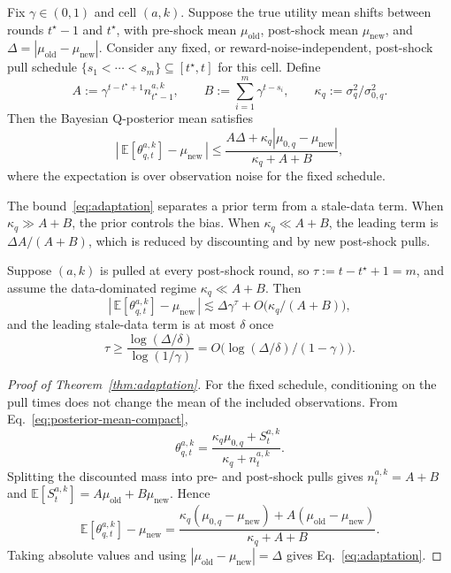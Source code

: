 \begin{theorem}
\label{thm:adaptation}
Fix $\gamma\in(0,1)$ and cell $(a,k)$. Suppose the true utility mean shifts
between rounds $t^\star-1$ and $t^\star$, with pre-shock mean
$\mu_{\mathrm{old}}$, post-shock mean $\mu_{\mathrm{new}}$, and
$\Delta=|\mu_{\mathrm{old}}-\mu_{\mathrm{new}}|$. Consider any fixed, or
reward-noise-independent, post-shock pull schedule
$\{s_1<\cdots<s_m\}\subseteq[t^\star,t]$ for this cell. Define
\[
A:=\gamma^{t-t^\star+1}n^{a,k}_{t^\star-1},\qquad
B:=\sum_{i=1}^m\gamma^{t-s_i},\qquad
\kappa_q:=\sigma_q^2/\sigma_{0,q}^2 .
\]
Then the Bayesian Q-posterior mean satisfies
\begin{equation}
\label{eq:adaptation}
\left|\,\mathbb{E}[\theta^{a,k}_{q,t}]-\mu_{\mathrm{new}}\,\right|
\leq
\frac{A\Delta+\kappa_q|\mu_{0,q}-\mu_{\mathrm{new}}|}
{\kappa_q+A+B},
\end{equation}
where the expectation is over observation noise for the fixed schedule.
\end{theorem}

\begin{remark}
\label{rem:adapt-regimes}
The bound~\eqref{eq:adaptation} separates a prior term from a stale-data term.
When $\kappa_q\gg A+B$, the prior controls the bias. When
$\kappa_q\ll A+B$, the leading term is $\Delta A/(A+B)$, which is reduced by
discounting and by new post-shock pulls.
\end{remark}

\begin{corollary}
\label{cor:recovery}
Suppose $(a,k)$ is pulled at every post-shock round, so
$\tau:=t-t^\star+1=m$, and assume the data-dominated regime
$\kappa_q\ll A+B$. Then
\[
\left|\,\mathbb{E}[\theta^{a,k}_{q,t}]-\mu_{\mathrm{new}}\,\right|
\lesssim
\Delta\gamma^\tau+O\!\big(\kappa_q/(A+B)\big),
\]
and the leading stale-data term is at most $\delta$ once
\[
\tau\geq\frac{\log(\Delta/\delta)}{\log(1/\gamma)}
=O\!\big(\log(\Delta/\delta)/(1-\gamma)\big).
\]
\end{corollary}

\begin{proof}[Proof of Theorem~\ref{thm:adaptation}]
For the fixed schedule, conditioning on the pull times does not change the mean
of the included observations. From Eq.~\eqref{eq:posterior-mean-compact},
\[
\theta^{a,k}_{q,t}=\frac{\kappa_q\mu_{0,q}+S^{a,k}_t}
{\kappa_q+n^{a,k}_t}.
\]
Splitting the discounted mass into pre- and post-shock pulls gives
$n^{a,k}_t=A+B$ and
$\mathbb{E}[S^{a,k}_t]=A\mu_{\mathrm{old}}+B\mu_{\mathrm{new}}$. Hence
\[
\mathbb{E}[\theta^{a,k}_{q,t}]-\mu_{\mathrm{new}}
=
\frac{\kappa_q(\mu_{0,q}-\mu_{\mathrm{new}})
+A(\mu_{\mathrm{old}}-\mu_{\mathrm{new}})}
{\kappa_q+A+B}.
\]
Taking absolute values and using
$|\mu_{\mathrm{old}}-\mu_{\mathrm{new}}|=\Delta$ gives
Eq.~\eqref{eq:adaptation}.
\end{proof}

